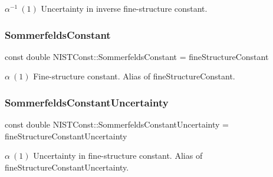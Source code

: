 $\alpha^{-1} \ (1)$ Uncertainty in inverse fine-\/structure constant. \mbox{\label{group___n_i_s_t_const-_fine_structure_constant_gaa076e4b419cd726407c8e2e9a44a381b}} 
\subsubsection{\texorpdfstring{Sommerfelds\+Constant}{SommerfeldsConstant}}
{\footnotesize\ttfamily const double N\+I\+S\+T\+Const\+::\+Sommerfelds\+Constant = fine\+Structure\+Constant}

$\alpha \ (1)$ Fine-\/structure constant. Alias of fine\+Structure\+Constant. \mbox{\label{group___n_i_s_t_const-_fine_structure_constant_ga4ad54e49e7d0bde74be46b2e97c25dfd}} 
\subsubsection{\texorpdfstring{Sommerfelds\+Constant\+Uncertainty}{SommerfeldsConstantUncertainty}}
{\footnotesize\ttfamily const double N\+I\+S\+T\+Const\+::\+Sommerfelds\+Constant\+Uncertainty = fine\+Structure\+Constant\+Uncertainty}

$\alpha \ (1)$ Uncertainty in fine-\/structure constant. Alias of fine\+Structure\+Constant\+Uncertainty. 
